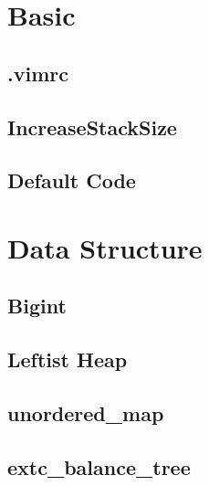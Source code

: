\documentclass[10pt,twocolumn,oneside]{article}
\begin{document}
\pagestyle{fancy}
\fancyfoot{}
\fancyhead[R]{\thepage}
\renewcommand{\headrulewidth}{0.4pt}
\renewcommand{\contentsname}{Contents} 

\scriptsize
\tableofcontents
\section{Basic}
\subsection{.vimrc}


\newpage

\subsection{IncreaseStackSize}


\subsection{Default Code}

\newpage

\section{Data Structure}
\subsection{Bigint}


\subsection{Leftist Heap}


\subsection{unordered\_map}


\subsection{extc\_balance\_tree}

\end{document}
